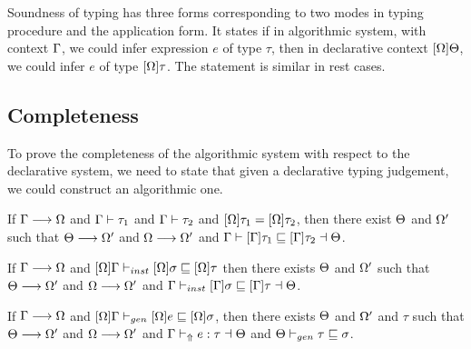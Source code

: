Soundness of typing has three forms corresponding to two modes in typing procedure and the application form. It states if in algorithmic system, with context $\Gamma$, we could infer expression $e$ of type $\tau$, then in declarative context $[\Omega]\Theta$, we could infer $e$ of type $[\Omega]\tau$. The statement is similar in rest cases.

\subsection{Completeness}

To prove the completeness of the algorithmic system with respect to the declarative system, we need to state that given a declarative typing judgement, we could construct an algorithmic one.

\begin{theorem}

If $\Gamma \longrightarrow \Omega$ and $\Gamma \vdash \tau_1$ and $\Gamma \vdash \tau_2$ and $[\Omega]\tau_1 = [\Omega]\tau_2$, then there exist $\Theta$ and $\Omega'$ such that $\Theta \longrightarrow \Omega'$ and $\Omega \longrightarrow \Omega'$ and $\Gamma \vdash [\Gamma]\tau_1 \sqsubseteq [\Gamma]\tau_2 \dashv \Theta$.
\end{theorem}

\begin{theorem}

If $\Gamma \longrightarrow \Omega$ and $[\Omega]\Gamma \vdash_{inst} [\Omega]\sigma \sqsubseteq [\Omega]\tau$
then there exists $\Theta$ and $\Omega'$
such that $\Theta \longrightarrow \Omega'$ and $\Omega \longrightarrow \Omega'$ and $\Gamma \vdash_{inst} [\Gamma]\sigma \sqsubseteq [\Gamma]\tau \dashv \Theta$.
\end{theorem}

\begin{theorem}

If $\Gamma \longrightarrow \Omega$ and $[\Omega] \Gamma \vdash_{gen} [\Omega]e \sqsubseteq [\Omega]\sigma$,
then there exists $\Theta$ and $\Omega'$ and $\tau$
such that $\Theta \longrightarrow \Omega'$ and $\Omega \longrightarrow \Omega'$ and $\Gamma \vdash_\Uparrow e : \tau \dashv \Theta$ and $\Theta \vdash_{gen} \tau \sqsubseteq \sigma$.
\end{theorem}

